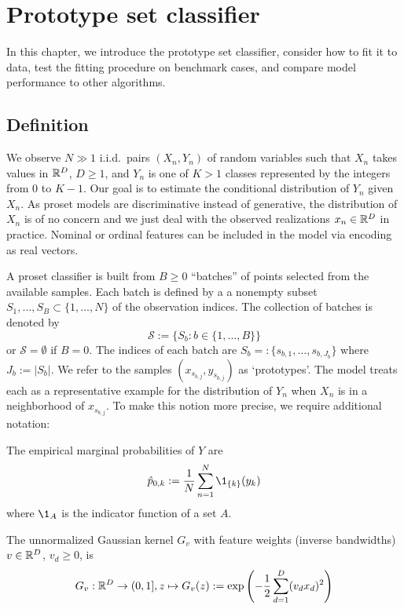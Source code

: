 \chapter{Prototype set classifier}
\label{ch_classifier}
%
In this chapter, we introduce the prototype set classifier, consider how to fit it to data, test the fitting procedure on benchmark cases, and compare model performance to other algorithms.
%
\section{Definition}
\label{sec_classifier_definition}
%
We observe $N\gg1$ i.i.d.\ pairs $(X_n,Y_n)$ of random variables such that $X_n$ takes values in $\mathbb{R}^D$, $D\geq1$, and $Y_n$ is one of $K>1$ classes represented by the integers from 0 to $K-1$.
Our goal is to estimate the conditional distribution of $Y_n$ given $X_n$.
As proset models are discriminative instead of generative, the distribution of $X_n$ is of no concern and we just deal with the observed realizations $x_n\in\mathbb{R}^D$ in practice.
Nominal or ordinal features can be included in the model via encoding as real vectors.\par
%
A proset classifier is built from $B\geq0$ ``batches'' of points selected from the available samples.
Each batch is defined by a a nonempty subset $S_1,\dots,S_B\subset\{1,\dots,N\}$ of the observation indices.
The collection of batches is denoted by
%
\begin{equation}
\mathcal{S}:=\{S_b:b\in\{1,\dots,B\}\}\label{eq_batches}
\end{equation}
%
or $\mathcal{S}=\emptyset$ if $B=0$.
The indices of each batch are $S_b=:\{s_{b,1},\dots,s_{b,J_b}\}$ where $J_b:=|S_b|$.
We refer to the samples $(x_{s_{b,j}},y_{s_{b,j}})$ as `prototypes'.
The model treats each as a representative example for the distribution of $Y_n$ when $X_n$ is in a neighborhood of $x_{s_{b,j}}$.
To make this notion more precise, we require additional notation:\par
%
The empirical marginal probabilities of $Y$ are
%
\begin{equation}
\hat{p}_{0,k}:=\frac{1}{N}\sum_{n=1}^N\1_{\{k\}}(y_k)\label{eq_p0k}
\end{equation}
%
where $\1_A$ is the indicator function of a set $A$.\par
%
The unnormalized Gaussian kernel $G_v$ with feature weights (inverse bandwidths) $v\in\mathbb{R}^D$, $v_d\geq0$, is
%
\begin{equation}
G_v:\mathbb{R}^D\rightarrow(0,1],
z\mapsto G_v(z):=\exp\left(-\frac{1}{2}\sum_{d=1}^D(v_dx_d)^2\right)\label{eq_kernel}
\end{equation}
